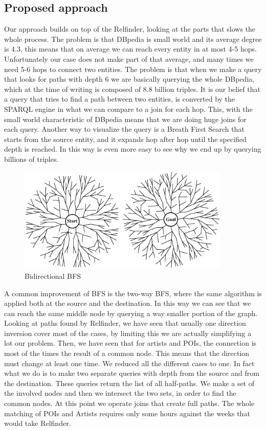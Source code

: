 \documentclass[paper=a4, fontsize=11pt]{scrartcl}
\begin{document}
\subsection{Proposed approach}
Our approach builds on top of the Relfinder, looking at the parts that slows the whole process. 
The problem is that DBpedia is small world and its average degree is 4.3, this means that on average we can reach every entity in at most 4-5 hops. Unfortunately our case does not make part of that average, and many times we need 5-6 hops to connect two entities. The problem is that when we make a query that looks for paths with depth 6 we are basically querying the whole DBpedia, which at the time of writing is composed of 8.8 billion triples.
It is our belief that a query that tries to find a path between two entities, is converted by the SPARQL engine in what we can compare to a join for each hop. This, with the small world characteristic of DBpedia means that we are doing huge joins for each query.
Another way to visualize the query is a Breath First Search that starts from the source entity, and it expands hop after hop until the specified depth is reached. In this way is even more easy to see why we end up by querying billions of triples.

\begin{figure}[!htb]
  \centering 
    \includegraphics[width=0.9\textwidth]{images/bfs.png}
    \caption{Bidirectional BFS}
\end{figure}

A common improvement of BFS is the two-way BFS, where the same algorithm is applied both at the source and the destination. In this way we can see that we can reach the same middle node by querying a way smaller portion of the graph.
Looking at paths found by Relfinder, we have seen that usually one direction inversion cover most of the cases, by limiting this we are actually simplifying a lot our problem. Then, we have seen that for artists and POIs, the connection is most of the times the result of a common node. This means that the direction must change at least one time. We reduced all the different cases to one. In fact what we do is to make two separate queries with depth from the source and from the destination. These queries return the list of all half-paths. We make a set of the involved nodes and then we intersect the two sets, in order to find the common nodes. At this point we operate joins that create full paths. The whole matching of POIs and Artists  requires only some hours against the weeks that would take Relfinder.
\end{document}
